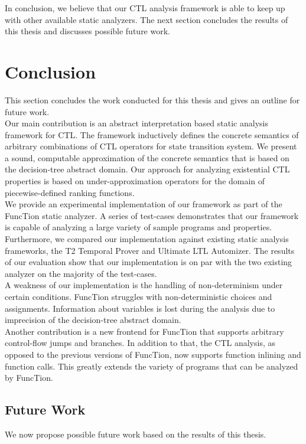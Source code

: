 \documentclass[11pt,a4paper,titlepage]{article}
\theoremstyle{definition}
\begin{document}
In conclusion, we believe that our CTL analysis framework is able to keep up with 
other available static analyzers. The next section concludes the results of this thesis and discusses possible future work.

\pagebreak
\section{Conclusion}\label{sec:conclusion}

This section concludes the work conducted for this thesis and gives an outline for future work.\\

Our main contribution is an abstract interpretation based static analysis framework for CTL.
The framework inductively defines the concrete semantics of arbitrary combinations of CTL operators for state transition system. 
We present a sound, computable approximation of the concrete semantics that is based on the decision-tree abstract domain.
Our approach for analyzing existential CTL properties is based on under-approximation operators 
for the domain of piecewise-defined ranking functions.\\

We provide an experimental implementation of our framework as part of the FuncTion static analyzer. 
A series of test-cases demonstrates that our framework is capable of analyzing a 
large variety of sample programs and properties. Furthermore, we compared our implementation 
against existing static analysis frameworks, the T2 Temporal Prover and Ultimate LTL Automizer.
The results of our evaluation show that our implementation is on par with the two 
existing analyzer on the majority of the test-cases.\\

A weakness of our implementation is the handling of non-determinism under certain conditions. 
FuncTion struggles with non-deterministic choices and assignments. 
Information about variables is lost during the analysis due to imprecision of the decision-tree abstract domain.\\

Another contribution is a new frontend for FuncTion that supports arbitrary control-flow jumps and branches. 
In addition to that, the CTL analysis, as opposed to the previous versions of FuncTion, 
now supports function inlining and function calls. This greatly extends the variety of programs that can be analyzed by FuncTion.

\subsection{Future Work}
We now propose possible future work based on the results of this thesis.
\end{document}
